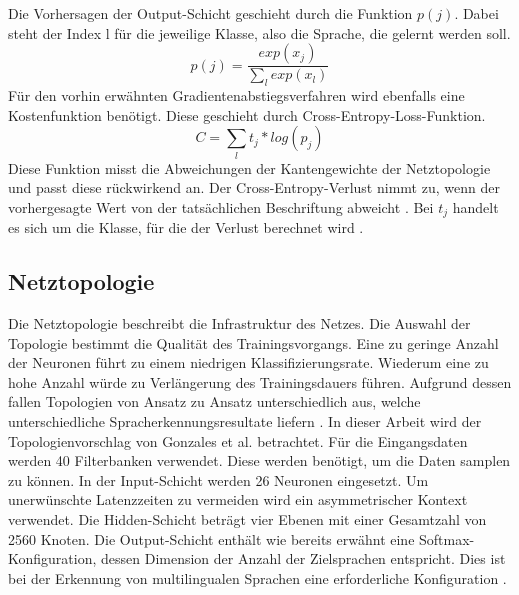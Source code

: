  Die Vorhersagen der Output-Schicht geschieht durch die Funktion $p(j)$. Dabei steht der Index l für die jeweilige Klasse, also die Sprache, die gelernt werden soll.  
\begin{equation}
p(j)= \frac{ exp(x_{j}) }{\sum_{l}{}{ exp(x_{l})} }
\label{eq:soft}
\end{equation}
Für den vorhin erwähnten Gradientenabstiegsverfahren wird ebenfalls eine Kostenfunktion benötigt. Diese geschieht durch Cross-Entropy-Loss-Funktion. 
\begin{equation}
C= \sum_{l}{}{ t_{j} * log(p_{j})} 
\label{eq:back}
\end{equation}
Diese Funktion misst die Abweichungen der Kantengewichte der Netztopologie und passt diese rückwirkend an. Der Cross-Entropy-Verlust nimmt zu, wenn der vorhergesagte Wert von der tatsächlichen Beschriftung abweicht \cite{MLCheatsheet.2017}. Bei $t_{j}$ handelt es sich um die Klasse, für die der Verlust berechnet wird \cite{GonzalezDominguez.2015}.

\subsection{Netztopologie}
Die Netztopologie beschreibt die Infrastruktur des Netzes. Die Auswahl der Topologie bestimmt die Qualität des Trainingsvorgangs. Eine zu geringe Anzahl der Neuronen führt zu einem niedrigen Klassifizierungsrate. Wiederum eine zu hohe Anzahl würde zu Verlängerung des Trainingsdauers führen. Aufgrund dessen fallen Topologien von Ansatz zu Ansatz unterschiedlich aus, welche unterschiedliche Spracherkennungsresultate liefern \cite{bishop.2006}. In dieser Arbeit wird der Topologienvorschlag von Gonzales et al. betrachtet. Für die Eingangsdaten werden 40 Filterbanken verwendet. Diese werden benötigt, um die Daten samplen zu können. In der Input-Schicht werden 26 Neuronen eingesetzt. Um unerwünschte Latenzzeiten zu vermeiden wird ein asymmetrischer Kontext verwendet. Die Hidden-Schicht beträgt vier Ebenen mit einer Gesamtzahl von 2560 Knoten. Die Output-Schicht enthält wie bereits erwähnt eine Softmax-Konfiguration, dessen Dimension der Anzahl der Zielsprachen entspricht. Dies ist bei der Erkennung von multilingualen Sprachen eine erforderliche Konfiguration \cite{GonzalezDominguez.2015}.
 
